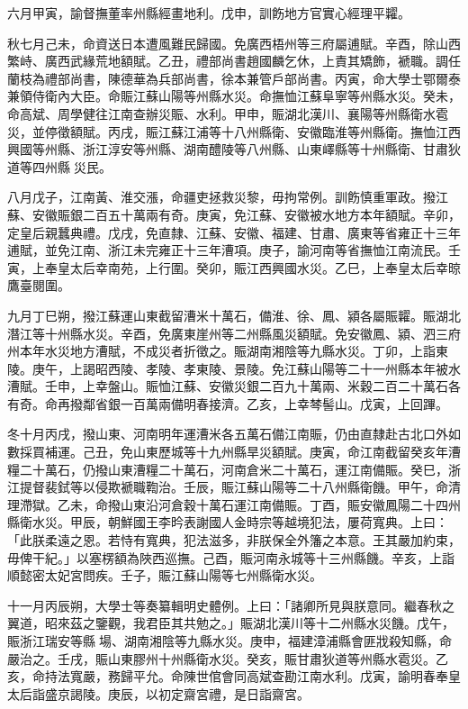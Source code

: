 \begin{pinyinscope}
六月甲寅，諭督撫董率州縣經畫地利。戊申，訓飭地方官實心經理平糶。

秋七月己未，命資送日本遭風難民歸國。免廣西梧州等三府屬逋賦。辛酉，除山西繁峙、廣西武緣荒地額賦。乙丑，禮部尚書趙國麟乞休，上責其矯飾，褫職。調任蘭枝為禮部尚書，陳德華為兵部尚書，徐本兼管戶部尚書。丙寅，命大學士鄂爾泰兼領侍衛內大臣。命賑江蘇山陽等州縣水災。命撫恤江蘇阜寧等州縣水災。癸未，命高斌、周學健往江南查辦災賑、水利。甲申，賑湖北漢川、襄陽等州縣衛水雹災，並停徵額賦。丙戌，賑江蘇江浦等十八州縣衛、安徽臨淮等州縣衛。撫恤江西興國等州縣、浙江淳安等州縣、湖南醴陵等八州縣、山東嶧縣等十州縣衛、甘肅狄道等四州縣災民。

八月戊子，江南黃、淮交漲，命疆吏拯救災黎，毋拘常例。訓飭慎重軍政。撥江蘇、安徽賑銀二百五十萬兩有奇。庚寅，免江蘇、安徽被水地方本年額賦。辛卯，定皇后親蠶典禮。戊戌，免直隸、江蘇、安徽、福建、甘肅、廣東等省雍正十三年逋賦，並免江南、浙江未完雍正十三年漕項。庚子，諭河南等省撫恤江南流民。壬寅，上奉皇太后幸南苑，上行圍。癸卯，賑江西興國水災。乙巳，上奉皇太后幸晾鷹臺閱圍。

九月丁巳朔，撥江蘇運山東截留漕米十萬石，備淮、徐、鳳、潁各屬賑糶。賑湖北潛江等十州縣水災。辛酉，免廣東崖州等二州縣風災額賦。免安徽鳳、潁、泗三府州本年水災地方漕賦，不成災者折徵之。賑湖南湘陰等九縣水災。丁卯，上詣東陵。庚午，上謁昭西陵、孝陵、孝東陵、景陵。免江蘇山陽等二十一州縣本年被水漕賦。壬申，上幸盤山。賑恤江蘇、安徽災銀二百九十萬兩、米穀二百二十萬石各有奇。命再撥鄰省銀一百萬兩備明春接濟。乙亥，上幸棽髻山。戊寅，上回蹕。

冬十月丙戌，撥山東、河南明年運漕米各五萬石備江南賑，仍由直隸赴古北口外如數採買補運。己丑，免山東歷城等十九州縣旱災額賦。庚寅，命江南截留癸亥年漕糧二十萬石，仍撥山東漕糧二十萬石，河南倉米二十萬石，運江南備賑。癸巳，浙江提督裴鉽等以侵欺褫職鞫治。壬辰，賑江蘇山陽等二十八州縣衛饑。甲午，命清理滯獄。乙未，命撥山東沿河倉穀十萬石運江南備賑。丁酉，賑安徽鳳陽二十四州縣衛水災。甲辰，朝鮮國王李昑表謝國人金時宗等越境犯法，屢荷寬典。上曰：「此朕柔遠之恩。若恃有寬典，犯法滋多，非朕保全外籓之本意。王其嚴加約束，毋俾干紀。」以塞楞額為陜西巡撫。己酉，賑河南永城等十三州縣饑。辛亥，上詣順懿密太妃宮問疾。壬子，賑江蘇山陽等七州縣衛水災。

十一月丙辰朔，大學士等奏纂輯明史體例。上曰：「諸卿所見與朕意同。繼春秋之翼道，昭來茲之鑒觀，我君臣其共勉之。」賑湖北漢川等十二州縣水災饑。戊午，賑浙江瑞安等縣場、湖南湘陰等九縣水災。庚申，福建漳浦縣會匪戕殺知縣，命嚴治之。壬戌，賑山東膠州十州縣衛水災。癸亥，賑甘肅狄道等州縣水雹災。乙亥，命持法寬嚴，務歸平允。命陳世倌會同高斌查勘江南水利。戊寅，諭明春奉皇太后詣盛京謁陵。庚辰，以初定齋宮禮，是日詣齋宮。


\end{pinyinscope}
